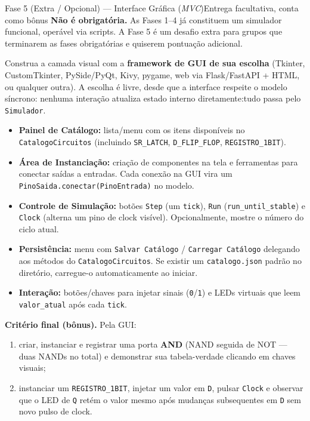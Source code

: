 \documentclass[11pt,a4paper]{article}
\begin{document}
\begin{phasebox}{Fase 5 (Extra / Opcional) — Interface Gráfica (\textit{MVC})}{Entrega facultativa, conta como bônus}
\textbf{Não é obrigatória.} As Fases 1--4 já constituem um simulador funcional, operável via scripts. A Fase 5 é um desafio extra para grupos que terminarem as fases obrigatórias e quiserem pontuação adicional.

Construa a camada visual com a \textbf{framework de GUI de sua escolha} (Tkinter, CustomTkinter, PySide/PyQt, Kivy, pygame, web via Flask/FastAPI + HTML, ou qualquer outra). A escolha é livre, desde que a interface respeite o modelo síncrono: nenhuma interação atualiza estado interno diretamente:tudo passa pelo \texttt{Simulador}.

\begin{itemize}
    \item \textbf{Painel de Catálogo:} lista/menu com os itens disponíveis no \texttt{CatalogoCircuitos} (incluindo \texttt{SR\_LATCH}, \texttt{D\_FLIP\_FLOP}, \texttt{REGISTRO\_1BIT}).
    \item \textbf{Área de Instanciação:} criação de componentes na tela e ferramentas para conectar saídas a entradas. Cada conexão na GUI vira um \texttt{PinoSaida.conectar(PinoEntrada)} no modelo.
    \item \textbf{Controle de Simulação:} botões \texttt{Step} (um \texttt{tick}), \texttt{Run} (\texttt{run\_until\_stable}) e \texttt{Clock} (alterna um pino de clock visível). Opcionalmente, mostre o número do ciclo atual.
    \item \textbf{Persistência:} menu com \texttt{Salvar Catálogo} / \texttt{Carregar Catálogo} delegando aos métodos do \texttt{CatalogoCircuitos}. Se existir um \texttt{catalogo.json} padrão no diretório, carregue-o automaticamente ao iniciar.
    \item \textbf{Interação:} botões/chaves para injetar sinais (\texttt{0}/\texttt{1}) e LEDs virtuais que leem \texttt{valor\_atual} após cada \texttt{tick}.
\end{itemize}

\begin{acceptbox}
\vspace{2pt}
\textbf{Critério final (bônus).} Pela GUI:
\begin{enumerate}[label=(\alph*)]
    \item criar, instanciar e registrar uma porta \textbf{AND} (NAND seguida de NOT — duas NANDs no total) e demonstrar sua tabela-verdade clicando em chaves visuais;
    \item instanciar um \texttt{REGISTRO\_1BIT}, injetar um valor em \texttt{D}, pulsar \texttt{Clock} e observar que o LED de \texttt{Q} retém o valor mesmo após mudanças subsequentes em \texttt{D} sem novo pulso de clock.
\end{enumerate}
\end{acceptbox}
\end{phasebox}
\end{document}
